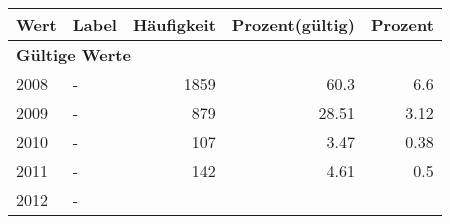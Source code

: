      \begin{longtable}{lXrrr}
     \toprule
     \textbf{Wert} & \textbf{Label} & \textbf{Häufigkeit} & \textbf{Prozent(gültig)} & \textbf{Prozent} \\
     \endhead
     \midrule
     \multicolumn{5}{l}{\textbf{Gültige Werte}}\\

     2008 &
     \multicolumn{1}{X}{ -  } &


       \num{1859} &
       \num[round-mode=places,round-precision=2]{60.3} &
         \num[round-mode=places,round-precision=2]{6.6} \\

     2009 &
     \multicolumn{1}{X}{ -  } &


       \num{879} &
       \num[round-mode=places,round-precision=2]{28.51} &
         \num[round-mode=places,round-precision=2]{3.12} \\

     2010 &
     \multicolumn{1}{X}{ -  } &


       \num{107} &
       \num[round-mode=places,round-precision=2]{3.47} &
         \num[round-mode=places,round-precision=2]{0.38} \\

     2011 &
     \multicolumn{1}{X}{ -  } &


       \num{142} &
       \num[round-mode=places,round-precision=2]{4.61} &
         \num[round-mode=places,round-precision=2]{0.5} \\

     2012 &
     \multicolumn{1}{X}{ -  } &



\end{longtable}
